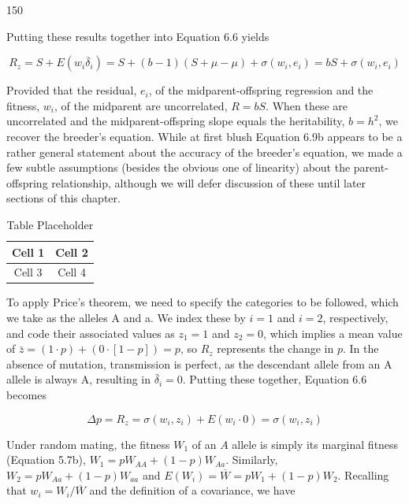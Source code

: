 \documentclass{article}
\begin{document}
150

Putting these results together into Equation 6.6 yields

\begin{equation}
R_{z}=S+E(w_{i}\overline{\delta}_{i})=S+(b-1)(S+\mu-\mu)+\sigma(w_{i},e_{i})=bS+\sigma(w_{i},e_{i})
\tag{6.9b}
\label{eq:6_9b}
\end{equation}

Provided that the residual,  $ e_i $, of the midparent-offspring regression and the fitness,  $ w_i $, of the midparent are uncorrelated,  $ R = bS $. When these are uncorrelated and the midparent-offspring slope equals the heritability,  $ b = h^2 $, we recover the breeder's equation. While at first blush Equation 6.9b appears to be a rather general statement about the accuracy of the breeder's equation, we made a few subtle assumptions (besides the obvious one of linearity) about the parent-offspring relationship, although we will defer discussion of these until later sections of this chapter.

\begin{table}[h]
\centering
\begin{tabular}{|c|c|}
\hline
Cell 1 & Cell 2 \\
\hline
Cell 3 & Cell 4 \\
\hline
\end{tabular}
\caption{Table Placeholder}
\end{table}

To apply Price’s theorem, we need to specify the categories to be followed, which we take as the alleles A and a. We index these by $i = 1$ and $i = 2$, respectively, and code their associated values as $z_1 = 1$ and $z_2 = 0$, which implies a mean value of $\bar{z} = (1 \cdot p) + (0 \cdot [1 - p]) = p$, so $R_z$ represents the change in $p$. In the absence of mutation, transmission is perfect, as the descendant allele from an A allele is always A, resulting in $\bar{\delta}_i = 0$. Putting these together, Equation 6.6 becomes

\begin{equation}
\Delta p=R_{z}=\sigma(w_{i},z_{i})+E(w_{i}\cdot0)=\sigma(w_{i},z_{i})
\end{equation}

Under random mating, the fitness  $ W_1 $ of an  $ A $ allele is simply its marginal fitness (Equation 5.7b),  $ W_1 = pW_{AA} + (1 - p)W_{Aa} $. Similarly,  $ W_2 = pW_{Aa} + (1 - p)W_{aa} $ and  $ E(W_i) = \overline{W} = pW_1 + (1 - p)W_2 $. Recalling that  $ w_i = W_i/\overline{W} $ and the definition of a covariance, we have
\end{document}
